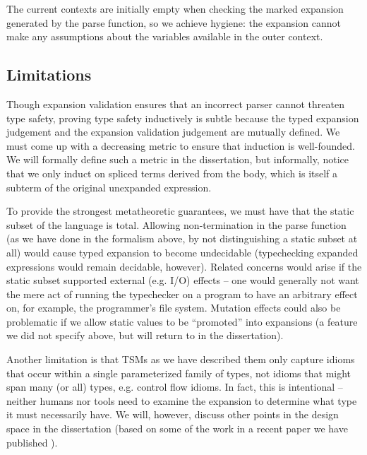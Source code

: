 \begin{enumerate}
The current contexts are initially empty when checking the marked expansion generated by the parse function, so we achieve hygiene: the expansion cannot make any assumptions about the variables available in the outer context. 
\end{enumerate}
\subsection{Limitations}\label{sec:tsms-limitations}
Though expansion validation ensures that an incorrect parser cannot threaten type safety,  proving type safety inductively is subtle because the typed expansion judgement and the expansion validation judgement are mutually defined. We must come up with a decreasing metric to ensure that induction is well-founded. We will formally define such a metric in the dissertation, but informally, notice that we only induct on spliced terms derived from the body, which is itself a subterm of the original unexpanded expression.

To provide the strongest metatheoretic guarantees, we must have that the static subset of the language is total. Allowing non-termination in the parse function (as we have done in the formalism above, by not distinguishing a static subset at all) would cause typed expansion to become undecidable (typechecking expanded expressions would remain decidable, however). Related concerns would arise if the static subset supported external (e.g. I/O) effects -- one would generally not want the mere act of running the typechecker on a program to have an arbitrary effect on, for example, the programmer's file system. Mutation effects could also be problematic if we allow static values to be ``promoted'' into expansions (a feature we did not specify above, but will return to in the dissertation).

Another limitation is that TSMs as we have described them only capture idioms that occur within a single parameterized family of types,  not idioms that might span many (or all) types, e.g. control flow idioms. In fact, this is intentional -- neither humans nor tools need to examine the expansion to determine what type it must necessarily have. We will, however, discuss other points in the design space in the dissertation (based on some of the work in a recent paper we have published \cite{sac15}).

